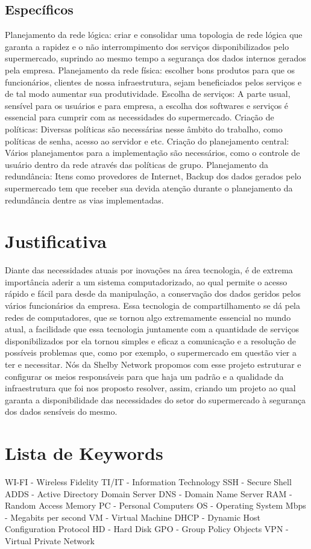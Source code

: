 \documentclass[12pt]{article}
\begin{document}
\subsection{Específicos}
Planejamento da rede lógica: criar e consolidar uma topologia de rede lógica que garanta a rapidez e o não interrompimento dos serviços disponibilizados pelo supermercado, suprindo ao mesmo tempo a segurança dos dados internos gerados pela empresa.
Planejamento da rede física: escolher bons produtos para que os funcionários, clientes de nossa infraestrutura, sejam beneficiados pelos serviços e de tal modo aumentar sua produtividade.
Escolha de serviços: A parte usual, sensível para os usuários e para empresa, a escolha dos softwares e serviços é essencial para cumprir com as necessidades do supermercado.
Criação de políticas: Diversas políticas são necessárias nesse âmbito do trabalho, como políticas de senha, acesso ao servidor e etc.
Criação do planejamento central: Vários planejamentos para a implementação são necessários, como o controle de usuário dentro da rede através das políticas de grupo.
Planejamento da redundância: Itens como provedores de Internet, Backup dos dados gerados pelo supermercado tem que receber sua devida atenção durante o planejamento da redundância dentre as vias implementadas.

\section{Justificativa}
Diante das necessidades atuais por inovações na área tecnologia, é de extrema importância aderir a um sistema computadorizado, ao qual permite o acesso rápido e fácil para desde da manipulação, a conservação dos dados geridos pelos vários funcionários da empresa. Essa tecnologia de compartilhamento se dá pela redes de computadores, que se tornou algo extremamente essencial no mundo atual, a facilidade que essa tecnologia juntamente com a quantidade de serviços disponibilizados por ela tornou simples e eficaz a comunicação e a resolução de possíveis problemas que, como por exemplo, o supermercado em questão vier a ter e necessitar. Nós da Shelby Network propomos com esse projeto estruturar e configurar os meios responsáveis para que haja um padrão e a qualidade da infraestrutura que foi nos proposto resolver, assim, criando um projeto ao qual garanta a disponibilidade das necessidades do setor do supermercado à segurança dos dados sensíveis do mesmo.

\section{Lista de Keywords}
WI-FI - Wireless Fidelity
TI/IT - Information Technology
SSH - Secure Shell
ADDS - Active Directory Domain Server
DNS - Domain Name Server
RAM - Random Access Memory
PC - Personal Computers
OS - Operating System
Mbps - Megabits per second
VM - Virtual Machine
DHCP - Dynamic Host Configuration Protocol
HD - Hard Disk
GPO - Group Policy Objects
VPN - Virtual Private Network
\end{document}
